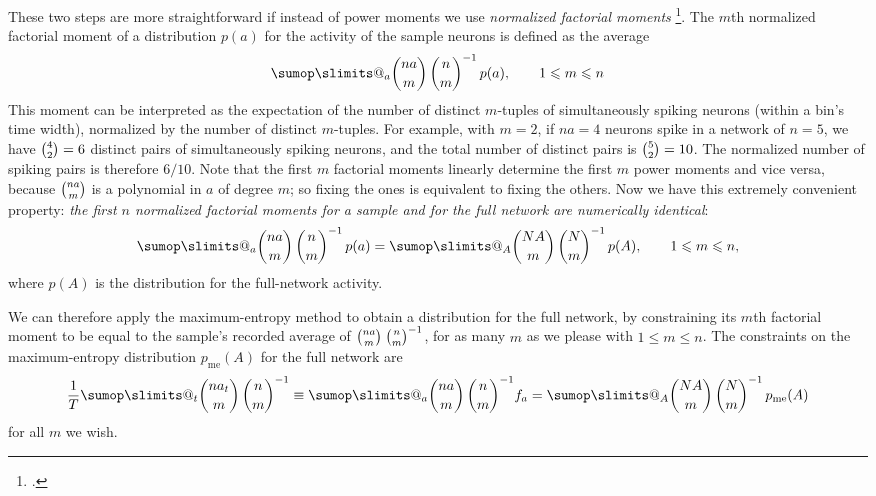 \documentclass[\ifafour a4paper,12pt,\else a5paper,10pt,\fi%
onecolumn,oneside,article,%
british%
]{memoir}
\makeatletter
\theoremstyle{remark}
\theoremstyle{innote}
\def\sum{\DOTSI\sumop\slimits@}
\newcommand*{\citep}{\footcites}
\renewcommand*{\le}{\leqslant}%
\newcommand*{\E}{\mathrm{E}}
\renewcommand*{\|}[1][]{\nonscript\,#1\vert\nonscript\;\mathopen{}}
\newcommand*{\yAv}{A}
\newcommand*{\yav}{a}
\newcommand*{\yff}{f}
\newcommand*{\ya}{\yav}%
\newcommand*{\yA}{\yAv}%
\newcommand*{\yH}{\varIota}
\newcommand*{\px}{p_{\text{me}}}
\newcommand*{\pxx}{p}
\makeatother
\begin{document}
These two steps are more straightforward if instead of power moments we use
\emph{normalized factorial moments} \citep{potts1953}. The $m$th normalized
factorial moment of a distribution $\pxx(\ya)$ for the activity of the
sample neurons is defined as the average
\begin{equation}
  \sum_{\ya} %
  \binom{n \ya}{m}\,  \binom{n}{m}^{-1}\, \pxx(\ya),
  \qquad 1\le m \le n
\end{equation}
This moment can be interpreted as the expectation of the number of distinct
$m$-tuples of simultaneously spiking neurons (within a bin's time width),
normalized by the number of distinct $m$-tuples. For example, with $m=2$,
if $na=4$ neurons spike in a network of $n=5$, we have $\tbinom{4}{2}=6$
distinct pairs of simultaneously spiking neurons, and the total number of
distinct pairs is $\tbinom{5}{2}=10$. The normalized number of spiking
pairs is therefore $6/10$. Note that the first $m$ factorial moments
linearly determine the first $m$ power moments and vice versa, because
$\tbinom{n\ya}{m}$ is a polynomial in $\ya$ of degree $m$; so fixing the
ones is equivalent to fixing the others. Now we have this extremely
convenient property: \emph{the first $n$ normalized factorial moments for a
  sample and for the full network are numerically identical}:
\begin{equation}
  \label{eq:equal_m_factorialmoments}
    \sum_{\ya} %
  \binom{n \ya}{m}\,  \binom{n}{m}^{-1}\, \pxx(\ya)
=    \sum_{\yA} %
  \binom{N \yA}{m}\,  \binom{N}{m}^{-1}\, \pxx(\yA),
  \qquad 1\le m \le n,
\end{equation}
where $\pxx(\yA)$ is the distribution for the full-network activity.

We can therefore apply the maximum-entropy method to obtain a distribution
for the full network, by constraining its $m$th factorial moment to be
equal to the sample's recorded average of
$\tbinom{n\ya}{m}\;\tbinom{n}{m}^{-1}$, for as many $m$ as we please with
$1\le m \le n$. The constraints on the maximum-entropy distribution
$\px(\yA)$ for the full network are
\begin{equation}
  \label{eq:final_constraint}
  \frac{1}{T}\sum_{t}\binom{n\ya_{t}}{m}\,\binom{n}{m}^{-1}
  \equiv
   \sum_{\ya}
  \binom{n \ya}{m}\,  \binom{n}{m}^{-1} \yff_{\ya}
  =
   \sum_{\yA}
  \binom{N \yA}{m}\,  \binom{N}{m}^{-1}\, \px(\yA)
\end{equation}
for all $m$ we wish.
\end{document}
